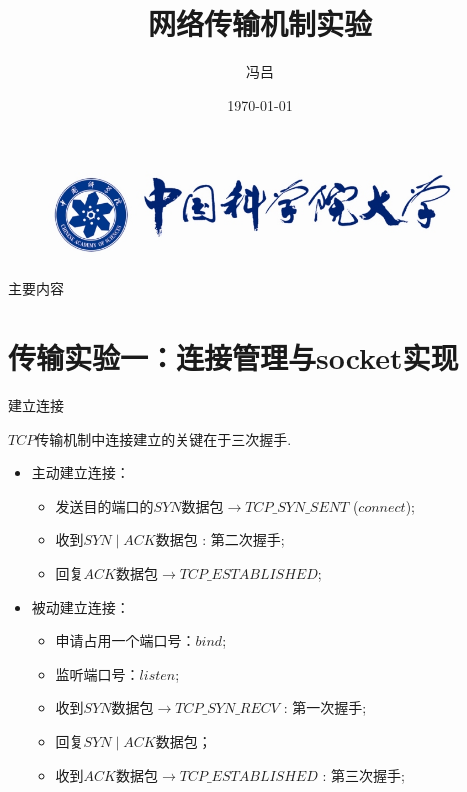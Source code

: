 \documentclass{beamer}
\title{网络传输机制实验}
\institute{University of Chinese Academy of Sciences}
\author{冯吕}
\date{\today}
\begin{document}

\begin{frame}
  \titlepage
  \begin{figure}[ht]\centering\includegraphics[scale=0.3]{./fig/ucas.jpg}\end{figure}
\end{frame}

\begin{frame}{主要内容}
  \tableofcontents
\end{frame}
 
\section{传输实验一：连接管理与socket实现}

\begin{frame}{建立连接}
  \begin{block}{}
  $TCP$传输机制中连接建立的关键在于三次握手.
\end{block}
\begin{itemize}
  \item 主动建立连接：
	\begin{itemize}
	  \item 发送目的端口的$SYN$数据包$\rightarrow TCP\_SYN\_SENT$ ($connect$);
		\item 收到$SYN\mid ACK$数据包 : 第二次握手;
		  \item 回复$ACK$数据包$\rightarrow TCP\_ESTABLISHED$;
	\end{itemize}
	\item 被动建立连接：
	  \begin{itemize}
		\item  申请占用一个端口号：$bind$;
		  \item 监听端口号：$listen$;
			\item 收到$SYN$数据包$\rightarrow TCP\_SYN\_RECV$ : 第一次握手;
			  \item 回复$SYN\mid ACK$数据包；
				\item 收到$ACK$数据包$\rightarrow TCP\_ESTABLISHED$ : 第三次握手;
	  \end{itemize}
\end{itemize}
\end{frame}
\end{document}
